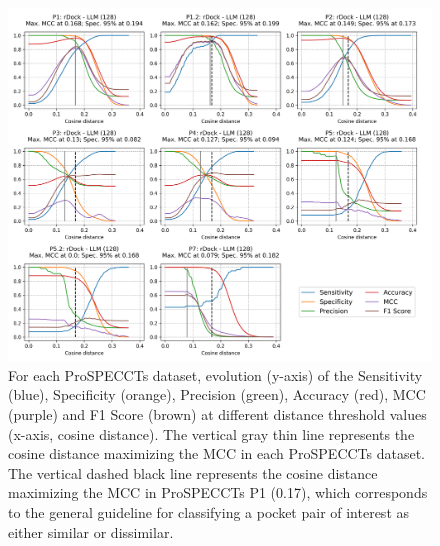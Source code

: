 \begin{figure}[htbp]
  \centering
  \includegraphics[width=\linewidth]{figures/PocketVec/Supplementary/FigS10_v2.png}
  \caption{
  For each ProSPECCTs dataset, evolution (y-axis) of the Sensitivity (blue), Specificity (orange), Precision (green), Accuracy (red), MCC (purple) and F1 Score (brown) at different distance threshold values (x-axis, cosine distance). The vertical gray thin line represents the cosine distance maximizing the MCC in each ProSPECCTs dataset. The vertical dashed black line represents the cosine distance maximizing the MCC in ProSPECCTs P1 (0.17), which corresponds to the general guideline for classifying a pocket pair of interest as either similar or dissimilar.
  }
  \label{PocketVec_FigS10}
\end{figure}


